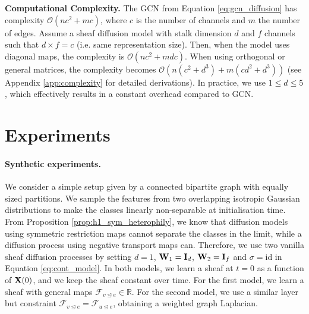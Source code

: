 \documentclass{article}
\def\mI{{\bf{I}}}
\def\mW{{\bf{W}}}
\def\mX{{\bf{X}}}
\def\gF{{\mathcal{F}}}
\def\gO{{\mathcal{O}}}
\def\sR{{\mathbb{R}}}
\newcommand{\tleq}{\trianglelefteq}
\begin{document}
\textbf{Computational Complexity. } The GCN from Equation \ref{eq:gcn_diffusion} has complexity $\gO(nc^2 + mc)$, where $c$ is the number of channels and $m$ the number of edges. Assume a sheaf diffusion model with stalk dimension $d$ and $f$ channels such that $d \times f = c$ (i.e. same representation size). Then, when the model uses diagonal maps, the complexity is $\gO(nc^2 + mdc)$. When using orthogonal or general matrices, the complexity becomes $\gO(n(c^2 + d^3) + m(cd^2 + d^3))$ (see Appendix \ref{app:complexity} for detailed derivations). 
In practice, we use $1 \leq d \leq 5$ 
, which effectively results in a constant overhead compared to GCN. 
\vspace{-10pt}

\section{Experiments}
\label{sec:exp}

\paragraph{Synthetic experiments.} We consider a simple setup given by a connected bipartite graph with equally sized partitions. We sample the features from two overlapping isotropic Gaussian distributions to make the classes linearly non-separable at initialisation time. From Proposition \ref{prop:h1_sym_heterophily}, we know that diffusion models using symmetric restriction maps cannot separate the classes in the limit, while a diffusion process using negative transport maps can. Therefore, we use two vanilla sheaf diffusion processes by setting $d=1$, $\mW_1 = \mI_d$, $\mW_2 = \mI_f$ and $\sigma = \mathrm{id}$ in Equation \ref{eq:cont_model}. In both models, we learn a sheaf at $t=0$ as a function of $\mX(0)$, and we keep the sheaf constant over time. For the first model, we learn a sheaf with general maps $\gF_{v \tleq e} \in \sR$. For the second model, we use a similar layer but constraint $\gF_{v \tleq e} = \gF_{u \tleq e}$, obtaining a weighted graph Laplacian.   
\end{document}
